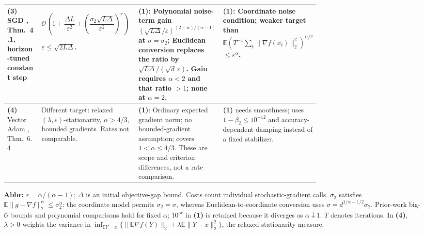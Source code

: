 \begin{table}[tp]
\begin{threeparttable}
\begin{tabularx}{\linewidth}{@{}>{\raggedright\arraybackslash}p{0.18\linewidth}>{\raggedright\arraybackslash}p{0.32\linewidth}>{\raggedright\arraybackslash}p{0.25\linewidth}>{\raggedright\arraybackslash}X@{}}
\midrule
\textbf{(3)} SGD \citep{htaLiu2026v1}, Thm.~4.1, horizon-tuned constant step
& $\mathcal{O}\!\left(1+\dfrac{\Delta L}{\varepsilon^2}+\left(\dfrac{\sigma_2\sqrt{L\Delta}}{\varepsilon^2}\right)^r\right)$\par $\varepsilon\leq\sqrt{2L\Delta}$.
& \textbf{(1)}: Polynomial noise-term gain $(\sqrt{L\Delta}/\varepsilon)^{(2-\alpha)/(\alpha-1)}$ at $\sigma=\sigma_2$; Euclidean conversion replaces the ratio by $\sqrt{L\Delta}/(\sqrt d\,\varepsilon)$. Gain requires $\alpha<2$ and that ratio $>1$; none at $\alpha=2$.
& \textbf{(1)}: Coordinate noise condition; weaker target than $\mathbb{E}(T^{-1}\sum_t\|\nabla f(x_t)\|_2^2)^{\alpha/2}$ $\leq\varepsilon^\alpha$. \\
\midrule
\textbf{(4)} Vector Adam \citep{htaPang2026v2}, Thm.~6.4
& Different target: relaxed $(\lambda,\varepsilon)$-stationarity, $\alpha>4/3$, bounded gradients. Rates not comparable.
& \textbf{(1)}: Ordinary expected gradient norm; no bounded-gradient assumption; covers $1<\alpha\leq4/3$. These are scope and criterion differences, not a rate comparison.
& \textbf{(1)} needs smoothness; uses $1-\beta_2\leq10^{-12}$ and accuracy-dependent damping instead of a fixed stabilizer. \\
\bottomrule
\end{tabularx}
\begin{tablenotes}[flushleft]\footnotesize
\item[] \textbf{Abbr:} $r=\alpha/(\alpha-1)$; $\Delta$ is an initial objective-gap bound. Costs count individual stochastic-gradient calls. $\sigma_2$ satisfies $\mathbb{E}\|g-\nabla f\|_2^\alpha\leq\sigma_2^\alpha$: the coordinate model permits $\sigma_2=\sigma$, whereas Euclidean-to-coordinate conversion uses $\sigma=d^{1/\alpha-1/2}\sigma_2$. Prior-work big-$\mathcal{O}$ bounds and polynomial comparisons hold for fixed $\alpha$; $10^{5r}$ in \textbf{(1)} is retained because it diverges as $\alpha\downarrow1$. $T$ denotes iterations. In \textbf{(4)}, $\lambda>0$ weights the variance in $\inf_{\mathbb{E}Y=x}\{\|\mathbb{E}\nabla f(Y)\|_2+\lambda\mathbb{E}\|Y-x\|_2^2\}$, the relaxed stationarity measure.
\end{tablenotes}
\end{threeparttable}
\end{table}
\clearpage
